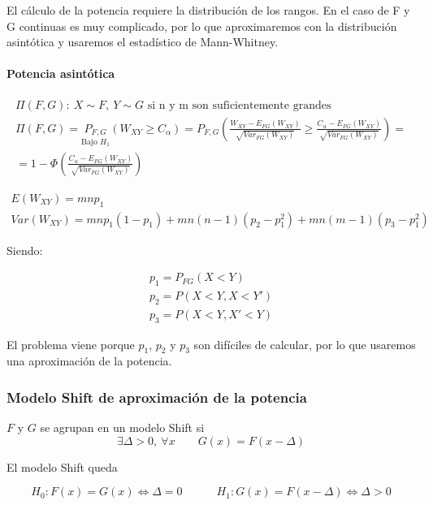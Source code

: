 El cálculo de la potencia requiere la distribución de los rangos. En el caso de F y G continuas es muy complicado, por lo que aproximaremos con la distribución asintótica y usaremos el estadístico de Mann-Whitney.

\paragraph{Potencia asintótica}

$$
\begin{array}{c}
    \Pi(F,G):\ X\sim F,\ Y\sim G\text{ si n y m son suficientemente grandes} \\
    \Pi(F,G)=\underset{\text{Bajo }H_1}{P_{F,G}}(W_{XY}\geq C_\alpha)=P_{F,G}\left(\frac{W_{XY}-E_{FG}(W_{XY})}{\sqrt{Var_{FG}(W_{XY})}}\geq \frac{C_\alpha-E_{FG}(W_{XY})}{\sqrt{Var_{FG}(W_{XY})}}\right)=\\
    =1-\Phi\left(\frac{C_\alpha-E_{FG}(W_{XY})}{\sqrt{Var_{FG}(W_{XY})}}\right)
\end{array}
$$

$$
\begin{array}{c}
    E(W_{XY})=mnp_1\\
    Var(W_{XY})=mnp_1(1-p_1)+mn(n-1)(p_2-p_1^2)+mn(m-1)(p_3-p_1^2)
\end{array}
$$

Siendo:

$$
\begin{array}{c}
    p_1=P_{FG}(X<Y)\\
    p_2=P(X<Y,X<Y')\\
    p_3=P(X<Y,X'<Y)
\end{array}
$$

El problema viene porque $p_1$, $p_2$ y $p_3$ son difíciles de calcular, por lo que usaremos una aproximación de la potencia.

\subsubsection{Modelo Shift de aproximación de la potencia}

\begin{theorem}
    $F$ y $G$ se agrupan en un modelo Shift si
    $$
    \exists\Delta>0,\ \forall x\quad\quad G(x)=F(x-\Delta)
    $$
\end{theorem}

El modelo Shift queda

$$
H_0:F(x)=G(x)\iff\Delta=0\quad\quad\quad H_1:G(x)=F(x-\Delta)\iff\Delta>0
$$

